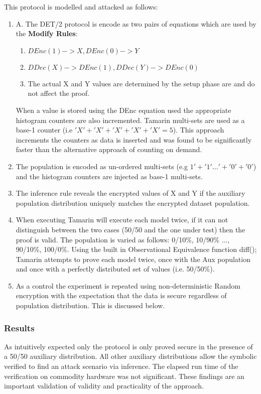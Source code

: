 \documentclass[journal]{IEEEtran}
\begin{document}
This protocol is modelled and attacked as follows:
\begin{enumerate}[label=(\Alph*)]
        \item A. The DET/2 protocol is encode as two pairs of equations which are used by the \textbf{Modify Rules}:
    \begin{enumerate}
        \item 	$DEnc(1) -> X,	DEnc(0) -> Y$
    	\item 	$DDec(X) ->  DEnc(1), DDec(Y) ->  DEnc(0)$
        \item       The actual X and Y values are determined by the setup phase are and do not affect the proof.
    \end{enumerate}
	When a value is stored using the DEnc equation used the appropriate histogram counters are also incremented. Tamarin multi-sets are used as a base-1 counter (i.e $'X'+'X'+'X'+'X'+'X' = 5$).  This approach increments the counters as data is inserted and was found to be significantly faster than the alternative approach of counting on demand.
\item The \aux{} population is encoded as un-ordered multi-sets (e.g $ 1' + '1' ... ' + '0' + '0'$) and the \aux{} histogram counters are injected as base-1 multi-sets.
\item The inference rule reveals the encrypted values of X and Y if the auxiliary population distribution uniquely matches the encrypted dataset population.
\item When executing Tamarin will execute each model twice, if it can not distinguish between the two cases (50/50 and the one under test) then the proof is valid. The population is varied as follows: 0/10\%, 10/90\% ..., 90/10\%, 100/0\%. 
Using the built in Observational Equivalence function diff(); Tamarin attempts to prove each model twice, once with the Aux population and once with a perfectly distributed set of values (i.e. 50/50\%). 
\item As a control the experiment is repeated using non-deterministic Random encryption with the expectation that the data is secure regardless of population distribution. This is discussed below.
\end{enumerate}

\subsubsection{Results} As intuitively expected only the protocol is only proved secure in the presence of a 50/50 auxiliary distribution. All other auxiliary distributions allow the symbolic verified to find an attack scenario via inference. The elapsed run time of the verification on commodity hardware was not significant. These findings are an important validation of validity and practicality of the approach.
\end{document}
